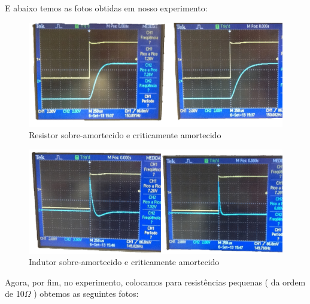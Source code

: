 \documentclass[12pt,letterpaper]{article}
\begin{document}
E abaixo temos as fotos obtidas em nosso experimento:
\begin{figure}[!htb]
  \centering
  \label{tabela}
  \includegraphics[scale=0.18]{img/rcrit.jpg}
  \caption{Resistor sobre-amortecido e criticamente amortecido}
\end{figure}
\begin{figure}[!htb]
  \centering
  \label{tabela}
  \includegraphics[scale=0.18]{img/indcrit.jpg}
  \caption{Indutor sobre-amortecido e criticamente amortecido}
\end{figure}
Agora, por fim, no experimento, colocamos para resistências pequenas ( da ordem de 10$\Omega$ ) obtemos as seguintes fotos:
\end{document}

